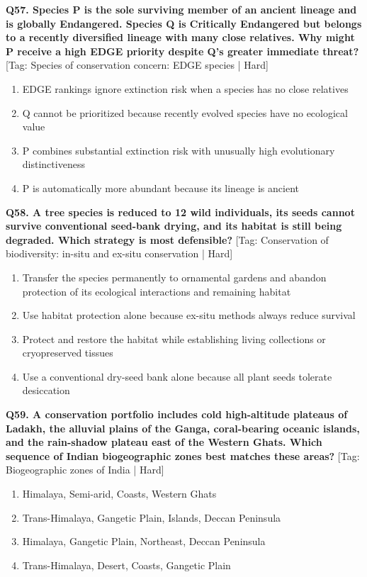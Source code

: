 \noindent\textbf{Q57. Species P is the sole surviving member of an ancient lineage and is globally Endangered. Species Q is Critically Endangered but belongs to a recently diversified lineage with many close relatives. Why might P receive a high EDGE priority despite Q's greater immediate threat?} \hfill [Tag: Species of conservation concern: EDGE species | Hard]
\begin{enumerate}[label=(\alph*),topsep=2pt,itemsep=1pt,partopsep=0pt,parsep=0pt]
    \item {EDGE rankings ignore extinction risk when a species has no close relatives}
    \item {Q cannot be prioritized because recently evolved species have no ecological value}
    \item {P combines substantial extinction risk with unusually high evolutionary distinctiveness}
    \item {P is automatically more abundant because its lineage is ancient}
\end{enumerate}
\vspace{2mm}

\noindent\textbf{Q58. A tree species is reduced to 12 wild individuals, its seeds cannot survive conventional seed-bank drying, and its habitat is still being degraded. Which strategy is most defensible?} \hfill [Tag: Conservation of biodiversity: in-situ and ex-situ conservation | Hard]
\begin{enumerate}[label=(\alph*),topsep=2pt,itemsep=1pt,partopsep=0pt,parsep=0pt]
    \item {Transfer the species permanently to ornamental gardens and abandon protection of its ecological interactions and remaining habitat}
    \item {Use habitat protection alone because ex-situ methods always reduce survival}
    \item {Protect and restore the habitat while establishing living collections or cryopreserved tissues}
    \item {Use a conventional dry-seed bank alone because all plant seeds tolerate desiccation}
\end{enumerate}
\vspace{2mm}

\noindent\textbf{Q59. A conservation portfolio includes cold high-altitude plateaus of Ladakh, the alluvial plains of the Ganga, coral-bearing oceanic islands, and the rain-shadow plateau east of the Western Ghats. Which sequence of Indian biogeographic zones best matches these areas?} \hfill [Tag: Biogeographic zones of India | Hard]
\begin{enumerate}[label=(\alph*),topsep=2pt,itemsep=1pt,partopsep=0pt,parsep=0pt]
    \item {Himalaya, Semi-arid, Coasts, Western Ghats}
    \item {Trans-Himalaya, Gangetic Plain, Islands, Deccan Peninsula}
    \item {Himalaya, Gangetic Plain, Northeast, Deccan Peninsula}
    \item {Trans-Himalaya, Desert, Coasts, Gangetic Plain}
\end{enumerate}
\vspace{2mm}

